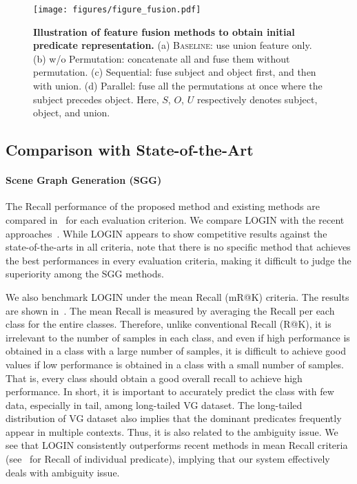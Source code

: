         \begin{figure}[t!]
            \centering
            \texttt{[image: figures/figure\_fusion.pdf]}
            \captionsetup{font=footnotesize}
            \caption{
              \textbf{Illustration of feature fusion methods to obtain initial predicate representation.} (a) \textsc{Baseline}: use union feature only. (b) w/o Permutation: concatenate all and fuse them without permutation. (c) Sequential: fuse subject and object first, and then with union. (d) Parallel: fuse all the permutations at once where the subject precedes object. Here, $S$, $O$, $U$ respectively denotes subject, object, and union.
            }
            \label{fig:fusion}
        \end{figure}
    
    \subsection{Comparison with State-of-the-Art}
    \label{section:results}
        \paragraph{Scene Graph Generation (SGG)}
            The Recall performance of the proposed method and existing methods are compared in~ for each evaluation criterion.
            We compare LOGIN with the recent approaches~\cite{xu2017scene, zellers2018neural, yang2018graph, chen2019knowledge, chen2019counterfactual, tang2019learning, zhang2019graphical}.
            While LOGIN appears to show competitive results against the state-of-the-arts in all criteria, note that there is no specific method that achieves the best performances in every evaluation criteria, making it difficult to judge the superiority among the SGG methods.
            
            We also benchmark LOGIN under the mean Recall (mR@K) criteria. The results are shown in~. The mean Recall is measured by averaging the Recall per each class for the entire classes. Therefore, unlike conventional Recall (R@K), it is irrelevant to the number of samples in each class, and even if high performance is obtained in a class with a large number of samples, it is difficult to achieve good values if low performance is obtained in a class with a small number of samples. That is, every class should obtain a good overall recall to achieve high performance. In short, it is important to accurately predict the class with few data, especially in tail, among long-tailed VG dataset. The long-tailed distribution of VG dataset also implies that the dominant predicates frequently appear in multiple contexts. Thus, it is also related to the ambiguity issue.
            We see that LOGIN consistently outperforms recent methods in mean Recall criteria (see~ for Recall of individual predicate), implying that our system effectively deals with ambiguity issue.
        
